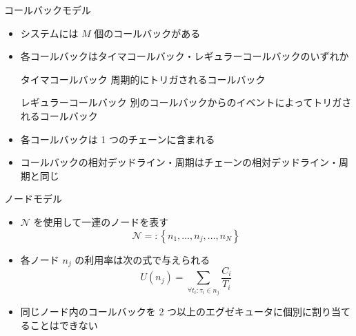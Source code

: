 

\begin{frame}{コールバックモデル}
    \begin{itemize}
        \item システムには $M$ 個のコールバックがある
        \item 各コールバックはタイマコールバック・レギュラーコールバックのいずれか
              \begin{block}{タイマコールバック}
                  周期的にトリガされるコールバック
              \end{block}
              \begin{block}{レギュラーコールバック}
                  別のコールバックからのイベントによってトリガされるコールバック
              \end{block}
              \vspace{3mm}
        \item 各コールバックは 1 つのチェーンに含まれる
        \item コールバックの相対デッドライン・周期はチェーンの相対デッドライン・周期と同じ
    \end{itemize}
\end{frame}

\begin{frame}{ノードモデル}
    \begin{itemize}
        \item  $\mathcal{N}$ を使用して一連のノードを表す
              \vspace{-2mm}
              \begin{equation*}
                  \mathcal{N}=:\left\{n_{1}, \ldots, n_{j}, \ldots, n_{N}\right\}
              \end{equation*}
        \item 各ノード $n_{j}$ の利用率は次の式で与えられる
              \vspace{-2mm}
              \begin{equation*}
                  U\left(n_{j}\right)=\sum_{\forall t_{i}: \tau_{i} \in n_{j}} \frac{C_{i}}{T_{i}}
              \end{equation*}
        \item 同じノード内のコールバックを 2 つ以上のエグゼキュータに個別に割り当てることはできない
    \end{itemize}
\end{frame}

